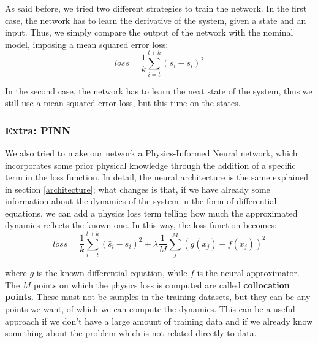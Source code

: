 As said before, we tried two different strategies to train the network. In
the first case, the network has to learn the derivative of the system,
given a state and an input. Thus, we simply compare the output of the
network with the nominal model, imposing a mean squared error loss:
\begin{equation}
    loss = \frac{1}{k}\sum_{i=t}^{t+k} (\bar{s}_i - s_i)^2
\end{equation}

In the second case, the network has to learn the next state of the system,
thus we still use a mean squared error loss, but this time on the states.


\subsubsection{Extra: PINN}

We also tried to make our network a Physics-Informed Neural network, which
incorporates some prior physical knowledge through the addition of a
specific term in the loss function. In detail, the neural architecture is
the same explained in section \ref{architecture}; what changes is that, if we
have already some information about the dynamics of the system in the form
of differential equations, we can add a physics loss term telling how much
the approximated dynamics reflects the known one. In this way, the loss
function becomes:
\begin{equation}
    loss = \frac{1}{k}\sum_{i=t}^{t+k} (\bar{s}_i - s_i)^2 + \lambda \frac{1}{M}\sum_{j}^{M}(g(x_j) - f(x_j))^2
\end{equation}

where $g$ is the known differential equation, while $f$ is the neural approximator. The $M$ points
on which the physics loss is computed are called \textbf{collocation points}. These must not be
samples in the training datasets, but they can be any points we want, of which we can compute the 
dynamics. This can be a useful approach if we don't have a large amount of training data and if we
already know something about the problem which is not related directly to data. 